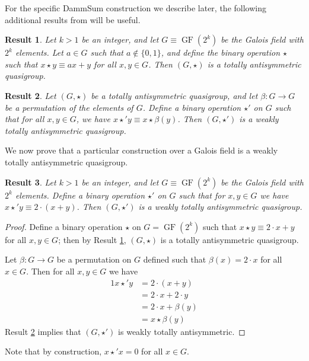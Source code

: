 \documentclass{article}
\theoremstyle{plain}
\newtheorem{result}{Result}[section]
\theoremstyle{definition}
\newcommand{\GF}{\operatorname{GF}}
\begin{document}
For the specific DammSum construction we describe later, the following additional results from \cite{damm2007} will be useful.

\begin{result}
	\label{result:gf_is_ta}
	Let $k > 1$ be an integer, and let $G \equiv \GF(2^k)$ be the Galois field with $2^k$ elements.
	Let $a \in G$ such that $a \not\in \{0,1\}$, and define the binary operation $\star$ such that $x \star y \equiv ax + y$ for all $x,y \in G$.
	Then $(G,\star)$ is a totally antisymmetric quasigroup.
\end{result}

\begin{result}
	\label{result:permute_wta}
	Let $(G,\star)$ be a totally antisymmetric quasigroup, and let $\beta: G \to G$ be a permutation of the elements of $G$.
	Define a binary operation $\star'$ on $G$ such that for all $x,y \in G$, we have $x \star' y \equiv x \star \beta(y)$.
	Then $(G,\star')$ is a weakly totally antisymmetric quasigroup.
\end{result}

We now prove that a particular construction over a Galois field is a weakly totally antisymmetric quasigroup.

\begin{result}
	\label{result:wta}
	Let $k > 1$ be an integer, and let $G \equiv \GF(2^k)$ be the Galois field with $2^k$ elements.
	Define a binary operation $\star'$ on $G$ such that for $x,y \in G$ we have $x \star' y \equiv 2 \cdot (x + y)$.
	Then $(G,\star')$ is a weakly totally antisymmetric quasigroup.
\end{result}

\begin{proof}
	Define a binary operation $\star$ on $G = \GF(2^k)$ such that $x \star y \equiv 2 \cdot x + y$ for all $x,y \in G$; then by Result \ref{result:gf_is_ta}, $(G,\star)$ is a totally antisymmetric quasigroup.

	Let $\beta: G \to G$ be a permutation on $G$ defined such that $\beta(x) = 2 \cdot x$ for all $x \in G$.
	Then for all $x,y \in G$ we have
	\begin{alignat*}{1}
		x \star' y &= 2 \cdot (x + y) \\
		&= 2 \cdot x + 2 \cdot y \\
		&= 2 \cdot x + \beta(y) \\
		&= x \star \beta(y)
	\end{alignat*}
	Result \ref{result:permute_wta} implies that $(G,\star')$ is weakly totally antisymmetric.
\end{proof}
Note that by construction, $x \star' x = 0$ for all $x \in G$.
\end{document}

